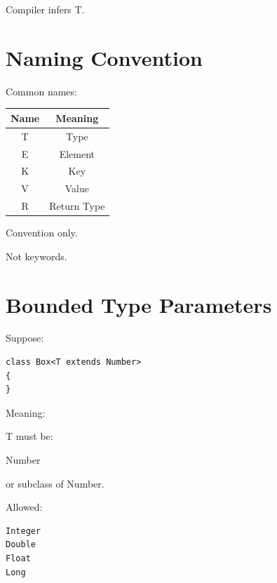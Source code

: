 \documentclass[11pt,a4paper]{book}
\begin{document}

Compiler infers T.


\section{Naming Convention}

Common names:

\begin{tabular}{|c|c|}
\hline
Name & Meaning \\
\hline
T & Type \\
\hline
E & Element \\
\hline
K & Key \\
\hline
V & Value \\
\hline
R & Return Type \\
\hline
\end{tabular}


Convention only.


Not keywords.


\section{Bounded Type Parameters}

Suppose:

\begin{verbatim}
class Box<T extends Number>
{
}
\end{verbatim}


Meaning:

T must be:


Number

or subclass of Number.


Allowed:

\begin{verbatim}
Integer
Double
Float
Long
\end{verbatim}
\end{document}

